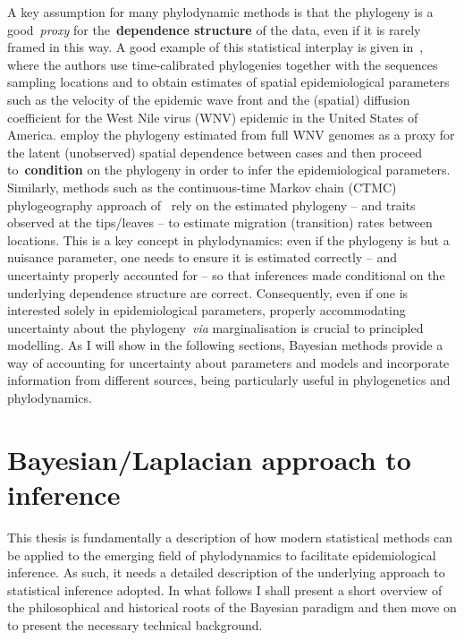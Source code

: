A key assumption for many phylodynamic methods is that the phylogeny is a good~\textit{proxy} for the~\textbf{dependence structure} of the data, even if it is rarely framed in this way.
A good example of this statistical interplay is given in~\cite{Pybus2012}, where the authors use time-calibrated phylogenies together with the sequences sampling locations and  to obtain estimates of spatial epidemiological parameters such as the velocity of the epidemic wave front and the (spatial) diffusion coefficient for the West Nile virus (WNV) epidemic in the United States of America.
\cite{Pybus2012} employ the phylogeny estimated from full WNV genomes as a proxy for the latent (unobserved) spatial dependence between cases and then proceed to~\textbf{condition} on the phylogeny in order to infer the epidemiological parameters.
Similarly, methods such as the continuous-time Markov chain (CTMC) phylogeography approach of~\cite{Lemey2009} rely on the estimated phylogeny -- and traits observed at the tips/leaves -- to estimate migration (transition) rates between locations.
This is a key concept in phylodynamics: even if the phylogeny is but a nuisance parameter, one needs to ensure it is estimated correctly -- and uncertainty properly accounted for -- so that inferences made conditional on the underlying dependence structure are correct.
Consequently, even if one is interested solely in epidemiological parameters, properly accommodating uncertainty about the phylogeny~\textit{via} marginalisation is crucial to principled modelling.
As I will show in the following sections, Bayesian methods provide a way of accounting for uncertainty about parameters and models and incorporate information from different sources, being particularly useful in phylogenetics and phylodynamics.

\section{Bayesian/Laplacian approach to inference}
\label{sec:bayesian_inference}

This thesis is fundamentally a description of how modern statistical methods can be applied to the emerging field of phylodynamics to facilitate epidemiological inference.
As such, it needs a detailed description of the underlying approach to statistical inference adopted.
In what follows I shall present a short overview of the philosophical and historical roots of the Bayesian paradigm and then move on to present the necessary technical background.

